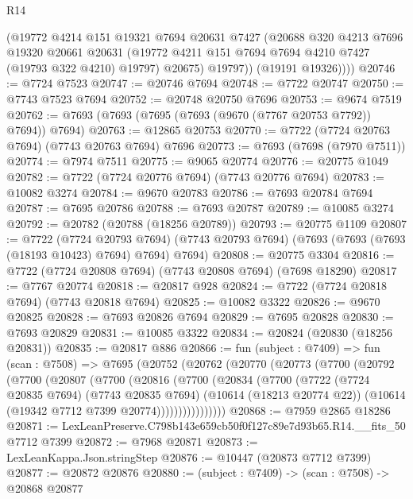 \begin{lexlean}{R14}
\begin{coremodule}
            (@19772
              @4214
              @151
              @19321
              @7694
              @20631
              @7427
              (@20688
                @320
                @4213
                @7696
                @19320
                @20661
                @20631
                (@19772 @4211 @151 @7694 @7694 @4210 @7427 (@19793 @322 @4210) @19797)
                @20675)
              @19797))
          (@19191 @19326))))
@20746 := @7724 @7523
@20747 := @20746 @7694
@20748 := @7722 @20747
@20750 := @7743 @7523 @7694
@20752 := @20748 @20750 @7696
@20753 := @9674 @7519
@20762 := @7693 (@7693 (@7695 (@7693 (@9670 (@7767 @20753 @7792)) @7694)) @7694)
@20763 := @12865 @20753
@20770 := @7722 (@7724 @20763 @7694) (@7743 @20763 @7694) @7696
@20773 := @7693 (@7698 (@7970 @7511))
@20774 := @7974 @7511
@20775 := @9065 @20774
@20776 := @20775 @1049
@20782 := @7722 (@7724 @20776 @7694) (@7743 @20776 @7694)
@20783 := @10082 @3274
@20784 := @9670 @20783
@20786 := @7693 @20784 @7694
@20787 := @7695 @20786
@20788 := @7693 @20787
@20789 := @10085 @3274
@20792 := @20782 (@20788 (@18256 @20789))
@20793 := @20775 @1109
@20807 := @7722
    (@7724 @20793 @7694)
    (@7743 @20793 @7694)
    (@7693 (@7693 (@7693 (@18193 @10423) @7694) @7694) @7694)
@20808 := @20775 @3304
@20816 := @7722 (@7724 @20808 @7694) (@7743 @20808 @7694) (@7698 @18290)
@20817 := @7767 @20774
@20818 := @20817 @928
@20824 := @7722 (@7724 @20818 @7694) (@7743 @20818 @7694)
@20825 := @10082 @3322
@20826 := @9670 @20825
@20828 := @7693 @20826 @7694
@20829 := @7695 @20828
@20830 := @7693 @20829
@20831 := @10085 @3322
@20834 := @20824 (@20830 (@18256 @20831))
@20835 := @20817 @886
@20866 := fun (subject : @7409) =>
  fun (scan : @7508) =>
  @7695
    (@20752
      (@20762
        (@20770
          (@20773
            (@7700
              (@20792
                (@7700
                  (@20807
                    (@7700
                      (@20816
                        (@7700
                          (@20834
                            (@7700
                              (@7722
                                (@7724 @20835 @7694)
                                (@7743 @20835 @7694)
                                (@10614 (@18213 @20774 @22))
                                (@10614 (@19342 @7712 @7399 @20774))))))))))))))))
@20868 := @7959 @2865 @18286
@20871 := LexLeanPreserve.C798b143e659cb50f0f127c89e7d93b65.R14.__fits_50 @7712 @7399
@20872 := @7968 @20871
@20873 := LexLeanKappa.Json.stringStep
@20876 := @10447 (@20873 @7712 @7399)
@20877 := @20872 @20876
@20880 := (subject : @7409) -> (scan : @7508) -> @20868 @20877

\end{coremodule}
\end{lexlean}
